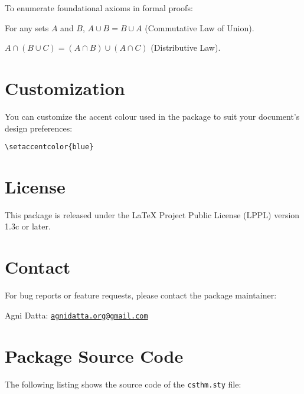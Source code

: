 \documentclass{article}
\begin{document}
To enumerate foundational axioms in formal proofs:

\begin{axiom}
\item For any sets \( A \) and \( B \), \( A \cup B = B \cup A \) (Commutative Law of Union).
\item \( A \cap (B \cup C) = (A \cap B) \cup (A \cap C) \) (Distributive Law).
\end{axiom}

\section{Customization}

You can customize the accent colour used in the package to suit your document's design preferences:

\begin{verbatim}
\setaccentcolor{blue}
\end{verbatim}

\section{License}

This package is released under the LaTeX Project Public License (LPPL) version 1.3c or later.

\section{Contact}

For bug reports or feature requests, please contact the package maintainer:

Agni Datta: \texttt{\href{mailto:agnidatta.org@gmail.com}{agnidatta.org@gmail.com}}

\section{Package Source Code}

The following listing shows the source code of the \texttt{csthm.sty} file:


\end{document}
